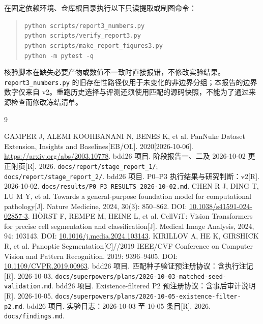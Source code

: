 \documentclass[11pt,a4paper,UTF8,fontset=fandol]{ctexart}
\newcommand{\code}[1]{\nolinkurl{#1}}
\begin{document}
在固定依赖环境、仓库根目录执行以下只读提取或制图命令：
\begin{quote}\small
\code{python scripts/report3_numbers.py}\\
\code{python scripts/verify_report3.py}\\
\code{python scripts/make_report_figures3.py}\\
\code{python -m pytest -q}
\end{quote}
核验脚本在缺失必要产物或数值不一致时直接报错，不修改实验结果。\code{report3_numbers.py} 的旧存在性路径仅用于未变化的非边界分组；本报告的边界数字仅来自 v2。重跑历史选择与评测还须使用匹配的源码快照，不能为了通过来源检查而修改冻结清单。

\begin{thebibliography}{9}
\raggedright
{} GAMPER J, ALEMI KOOHBANANI N, BENES K, et al. PanNuke Dataset Extension, Insights and Baselines[EB/OL]. 2020[2026-10-06]. \url{https://arxiv.org/abs/2003.10778}.
 bdd26 项目. 阶段报告一、二及 2026-10-02 更正附页[R]. 2026. \code{docs/report/stage_report_1/}; \code{docs/report/stage_report_2/}.
 bdd26 项目. P0--P3 执行结果与研究判断：v2[R]. 2026-10-02. \code{docs/results/P0_P3_RESULTS_2026-10-02.md}.
 CHEN R J, DING T, LU M Y, et al. Towards a general-purpose foundation model for computational pathology[J]. Nature Medicine, 2024, 30(3): 850--862. DOI: \href{https://doi.org/10.1038/s41591-024-02857-3}{10.1038/s41591-024-02857-3}.
 H\"ORST F, REMPE M, HEINE L, et al. CellViT: Vision Transformers for precise cell segmentation and classification[J]. Medical Image Analysis, 2024, 94: 103143. DOI: \href{https://doi.org/10.1016/j.media.2024.103143}{10.1016/j.media.2024.103143}.
 KIRILLOV A, HE K, GIRSHICK R, et al. Panoptic Segmentation[C]//2019 IEEE/CVF Conference on Computer Vision and Pattern Recognition. 2019: 9396--9405. DOI: \href{https://doi.org/10.1109/CVPR.2019.00963}{10.1109/CVPR.2019.00963}.
 bdd26 项目. 匹配种子验证预注册协议：含执行注记[R]. 2026-10-03. \code{docs/superpowers/plans/2026-10-03-matched-seed-validation.md}.
 bdd26 项目. Existence-filtered P2 预注册协议：含事后审计说明[R]. 2026-10-05. \code{docs/superpowers/plans/2026-10-05-existence-filter-p2.md}.
 bdd26 项目. 实验日志：2026-10-03 至 10-05 条目[R]. 2026. \code{docs/findings.md}.
\end{thebibliography}
\end{document}
